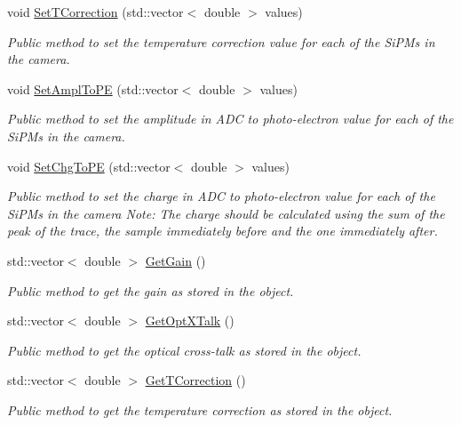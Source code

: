 \begin{DoxyCompactItemize}
void \hyperlink{classISiPM_a915471416f44f92380cc450dce689e25}{Set\+T\+Correction} (std\+::vector$<$ double $>$ values)
\begin{DoxyCompactList}\small\item\em Public method to set the temperature correction value for each of the Si\+P\+Ms in the camera. \end{DoxyCompactList}\item 
void \hyperlink{classISiPM_a232f9d00787139b7c972fa6834bc2a43}{Set\+Ampl\+To\+PE} (std\+::vector$<$ double $>$ values)
\begin{DoxyCompactList}\small\item\em Public method to set the amplitude in A\+DC to photo-\/electron value for each of the Si\+P\+Ms in the camera. \end{DoxyCompactList}\item 
void \hyperlink{classISiPM_a7f96e36528e099f75a32d54133917ca8}{Set\+Chg\+To\+PE} (std\+::vector$<$ double $>$ values)
\begin{DoxyCompactList}\small\item\em Public method to set the charge in A\+DC to photo-\/electron value for each of the Si\+P\+Ms in the camera Note\+: The charge should be calculated using the sum of the peak of the trace, the sample immediately before and the one immediately after. \end{DoxyCompactList}\item 
std\+::vector$<$ double $>$ \hyperlink{classISiPM_aac9fd397344bc7ca1263cc91edc61118}{Get\+Gain} ()
\begin{DoxyCompactList}\small\item\em Public method to get the gain as stored in the object. \end{DoxyCompactList}\item 
std\+::vector$<$ double $>$ \hyperlink{classISiPM_ad8b5408dd198cc4e70f2cdc8244e69c2}{Get\+Opt\+X\+Talk} ()
\begin{DoxyCompactList}\small\item\em Public method to get the optical cross-\/talk as stored in the object. \end{DoxyCompactList}\item 
std\+::vector$<$ double $>$ \hyperlink{classISiPM_ac5dce66434f6fca0dfca279f4a157f30}{Get\+T\+Correction} ()
\begin{DoxyCompactList}\small\item\em Public method to get the temperature correction as stored in the object. \end{DoxyCompactList}\item 

\end{DoxyCompactItemize}
